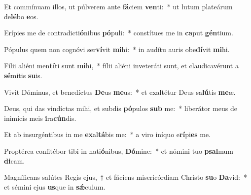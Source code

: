 \item Et commínuam illos, ut púlverem ante \textbf{fá}ciem \textbf{ven}ti:~* ut lutum plateárum de\textbf{lé}bo \textbf{e}os.
\item Erípies me de contradicti\textbf{ó}nibus \textbf{pó}puli:~* constítues me in \textbf{ca}put \textbf{gén}tium.
\item Pópulus quem non cognóvi ser\textbf{ví}vit \textbf{mi}hi:~* in audítu auris obe\textbf{dí}vit \textbf{mi}hi.
\item Fílii aliéni men\textbf{tí}ti sunt \textbf{mi}hi,~* fílii aliéni inveteráti sunt, et claudicavérunt a \textbf{sé}mitis \textbf{su}is.
\item Vivit Dóminus, et benedíctus \textbf{De}us \textbf{me}us:~* et exaltétur Deus sa\textbf{lú}tis \textbf{me}æ.
\item Deus, qui das vindíctas mihi, et subdis \textbf{pó}pulos \textbf{sub} me:~* liberátor meus de inimícis meis \textbf{i}ra\textbf{cún}dis.
\item Et ab insurgéntibus in me \textbf{ex}al\textbf{tá}bis me:~* a viro iníquo e\textbf{rí}pi\textbf{es} me.
\item Proptérea confitébor tibi in nati\textbf{ó}nibus, \textbf{Dó}mine:~* et nómini tuo \textbf{psal}mum \textbf{di}cam.
\item Magníficans salútes Regis ejus,~† et fáciens misericórdiam Christo \textbf{su}o \textbf{Da}vid:~* et sémini ejus \textbf{us}que in \textbf{sǽ}culum.

